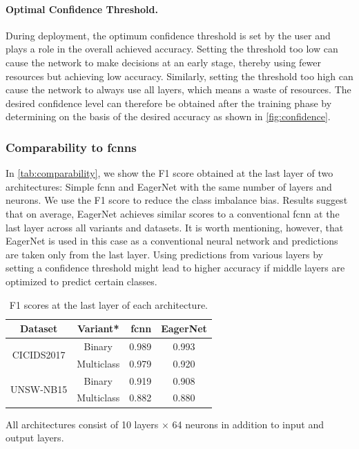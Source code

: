 \documentclass[conference]{IEEEtran}
\newcommand{\mynote}[3]{
    \fbox{\bfseries\sffamily\scriptsize#1}
    {\small$\blacktriangleright$\textsf{\emph{\color{#3}{#2}}}$\blacktriangleleft$}}
\newcommand{\todo}[1]{\mynote{TODO}{#1}{red}}
\begin{document}



\paragraph{Optimal Confidence Threshold.}
During deployment, the optimum confidence threshold is set by the user and plays a role in the overall achieved accuracy. Setting the threshold too low can cause the network to make decisions at an early stage, thereby using fewer resources but achieving low accuracy. Similarly, setting the threshold too high can cause the network to always use all layers, which means a waste of resources. The desired confidence level can therefore be obtained after the training phase by determining on the basis of the desired accuracy as shown in \autoref{fig:confidence}.

\subsubsection{Comparability to \glspl{fcnn}}
\label{subsubsec:comparability_to_fnns}

In \autoref{tab:comparability}, we show the F1 score obtained at the last layer of two architectures: Simple \gls{fcnn} and EagerNet with the same number of layers and neurons. We use the F1 score to reduce the class imbalance bias. Results suggest that on average, EagerNet achieves similar scores to a conventional \gls{fcnn} at the last layer across all variants and datasets. It is worth mentioning, however, that EagerNet is used in this case as a conventional neural network and predictions are taken only from the last layer. Using predictions from various layers by setting a confidence threshold might lead to higher accuracy if middle layers are optimized to predict certain classes.

\begin{table}[H]

\centering
\begin{tabular}{ccrc}
\toprule
\textbf{Dataset} & \textbf{Variant*} & \textbf{\gls{fcnn}} & \textbf{EagerNet} \\
\midrule
\multirow{2}{*}{CICIDS2017} & Binary & 0.989 & 0.993 \\
 & Multiclass & 0.979 & 0.920 \\
\midrule
\multirow{2}{*}{UNSW-NB15} & Binary & 0.919 & 0.908 \\
 & Multiclass & 0.882 & 0.880 \\
\midrule

\end{tabular}
\vspace{1ex}

{\raggedright * All architectures consist of 10 layers $\times$ 64 neurons in addition to input and output layers. \par}
\caption{F1 scores at the last layer of each architecture.}
\label{tab:comparability}
\end{table}
\end{document}
